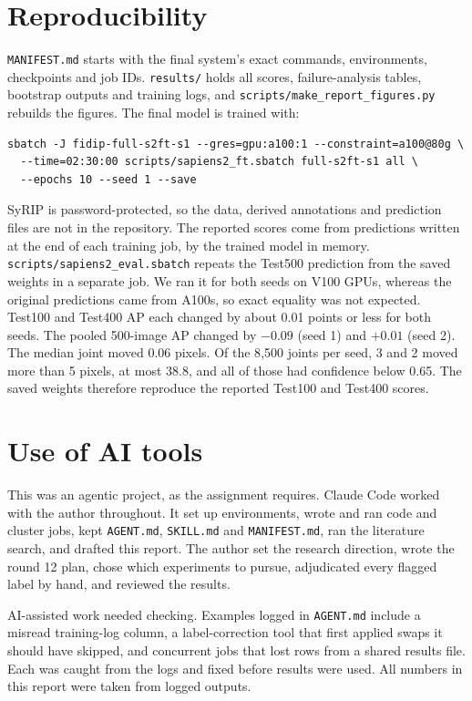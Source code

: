 \documentclass[11pt]{article}
\newcommand{\repo}[1]{\texttt{#1}}
\begin{document}
\section{Reproducibility}
\repo{MANIFEST.md} starts with the final system's exact commands, environments, checkpoints and job IDs. \repo{results/} holds all scores, failure-analysis tables, bootstrap outputs and training logs, and \repo{scripts/make\_report\_figures.py} rebuilds the figures. The final model is trained with:
\begin{verbatim}
sbatch -J fidip-full-s2ft-s1 --gres=gpu:a100:1 --constraint=a100@80g \
  --time=02:30:00 scripts/sapiens2_ft.sbatch full-s2ft-s1 all \
  --epochs 10 --seed 1 --save
\end{verbatim}
SyRIP is password-protected, so the data, derived annotations and prediction files are not in the repository. The reported scores come from predictions written at the end of each training job, by the trained model in memory. \repo{scripts/sapiens2\_eval.sbatch} repeats the Test500 prediction from the saved weights in a separate job. We ran it for both seeds on V100 GPUs, whereas the original predictions came from A100s, so exact equality was not expected. Test100 and Test400 AP each changed by about 0.01 points or less for both seeds. The pooled 500-image AP changed by $-0.09$ (seed 1) and $+0.01$ (seed 2). The median joint moved 0.06 pixels. Of the 8{,}500 joints per seed, 3 and 2 moved more than 5 pixels, at most 38.8, and all of those had confidence below 0.65. The saved weights therefore reproduce the reported Test100 and Test400 scores.

\section{Use of AI tools}
This was an agentic project, as the assignment requires. Claude Code worked with the author throughout. It set up environments, wrote and ran code and cluster jobs, kept \repo{AGENT.md}, \repo{SKILL.md} and \repo{MANIFEST.md}, ran the literature search, and drafted this report. The author set the research direction, wrote the round 12 plan, chose which experiments to pursue, adjudicated every flagged label by hand, and reviewed the results.

AI-assisted work needed checking. Examples logged in \repo{AGENT.md} include a misread training-log column, a label-correction tool that first applied swaps it should have skipped, and concurrent jobs that lost rows from a shared results file. Each was caught from the logs and fixed before results were used. All numbers in this report were taken from logged outputs.
\end{document}

